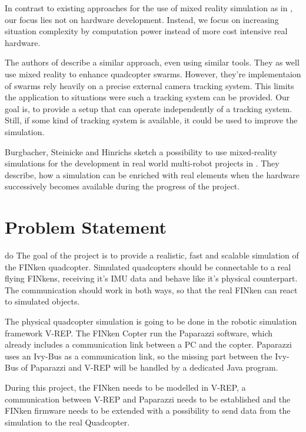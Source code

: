 In contrast to existing approaches for the use of mixed reality simulation as in \cite{Chen2011}, our focus lies not on hardware development.
Instead, we focus on increasing situation complexity by computation power instead of more cost intensive real hardware.

The authors of  \cite{Honig2015} describe a similar approach, even using similar tools. 
They as well use mixed reality to enhance quadcopter swarms.
However, they're implementaion of swarms rely heavily on a precise external camera tracking system. 
This limits the application to situations were such a tracking system can be provided.
Our goal is, to provide a setup that can operate independently of a tracking system.
Still, if some kind of tracking system is available, it could be used to improve the simulation.

Burgbacher, Steinicke and Hinrichs sketch a possibility to use mixed-reality simulations for the development in real world multi-robot projects in \cite{Burgbacher2011}.
They describe, how a simulation can be enriched with real elements when the hardware successively becomes available during the progress of the project.


       


  
\section{Problem Statement}do
\label{sec:problem}
    The goal of the project is to provide a realistic, fast and scalable simulation of the FINken quadcopter.  
    Simulated quadcopters should be connectable to a real flying FINkens, receiving it's    
    \gls{IMU} data and behave like it's physical counterpart. 
    The communication should work in both ways, so that the real FINken can react to simulated objects.

The physical quadcopter simulation is going to be done in the robotic simulation framework V-REP\cite{vrep}. 
The FINken Copter run the Paparazzi\cite{pprz} software, which already includes a communication link between a PC and the copter. 
Paparazzi uses an Ivy-Bus as a communication link, so the missing part between the Ivy-Bus of Paparazzi and V-REP will be handled by a dedicated Java program.

During this project, the FINken needs to be modelled in V-REP, a communication between V-REP and Paparazzi needs to be established and the FINken firmware needs to be extended with a possibility to send data from the simulation to the real Quadcopter.
 
